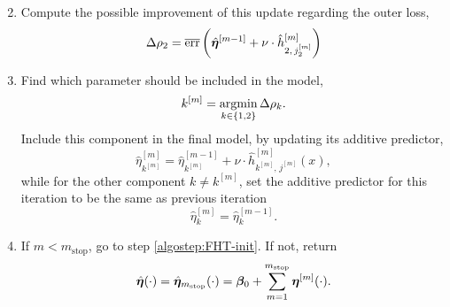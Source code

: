 \begin{enumerate}
\begin{equation*}
        \end{equation*}
    \item
        Compute the possible improvement of this update regarding the outer loss,
        \begin{equation*}
            \Delta\rho_2=\overline{\text{err}}\left(\hat{\boldsymbol{\eta}}^{[m-1]} + \nu \cdot \hat{h}^{[m]}_{2,\,j_2^{[m]}} \right)
        \end{equation*}
    \item
    \label{algostep:FHT-end}
        Find which parameter should be included in the model,
        \begin{equation*}
            k^{[m]}=\operatorname*{argmin}_{k\in\{1,2\}}\Delta\rho_k.
        \end{equation*}
        Include this component in the final model, by updating its additive predictor,
        \begin{equation*}
            \hat{\eta}^{[m]}_{k^{[m]}}=\hat{\eta}^{[m-1]}_{k^{[m]}}+\nu\cdot\hat{h}^{[m]}_{k^{[m]},\,j^{[m]}}(x),
        \end{equation*}
        while for the other component $k\neq k^{[m]}$, set the additive predictor for this iteration to be the same as previous iteration
        \begin{equation*}
            \hat{\eta}^{[m]}_{k}=\hat{\eta}^{[m-1]}_{k}.
        \end{equation*}
    \item
        If $m<m_{\text{stop}}$, go to step \ref{algostep:FHT-init}.
        If not, return
        \begin{equation*}
            \hat{\boldsymbol{\eta}}(\cdot)=\hat{\boldsymbol{\eta}}_{m_{\text{stop}}}(\cdot)=\boldsymbol{\beta}_0+\sum_{m=1}^{m_{\text{stop}}}\boldsymbol{\eta}^{[m]}(\cdot).
        \end{equation*}
\end{enumerate}

